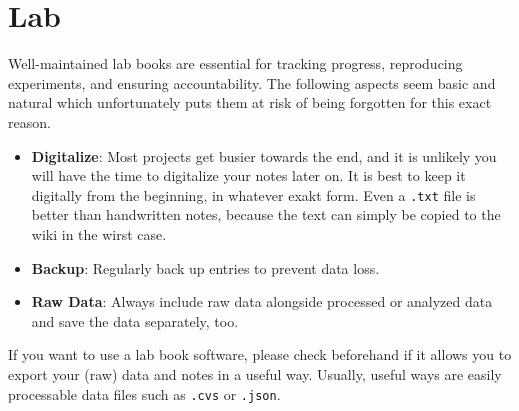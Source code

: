 \section{Lab} \label{sec:lab} 
Well-maintained lab books are essential for tracking progress, reproducing experiments, and ensuring accountability.
The following aspects seem basic and natural which unfortunately puts them at risk of being forgotten for this exact reason.  
\begin{itemize}
    \item \textbf{Digitalize}: Most projects get busier towards the end, and it is unlikely you will have the time to digitalize your notes later on.
    It is best to keep it digitally from the beginning, in whatever exakt form.
    Even a \texttt{.txt} file is better than handwritten notes, because the text can simply be copied to the wiki in the wirst case.
    \item \textbf{Backup}: Regularly back up entries to prevent data loss.
    \item \textbf{Raw Data}: Always include raw data alongside processed or analyzed data and save the data separately, too.
\end{itemize}

\noindent If you want to use a lab book software, please check beforehand if it allows you to export your (raw) data and notes in a useful way.  Usually, useful ways are easily processable data files such as \texttt{.cvs} or \texttt{.json}. 

